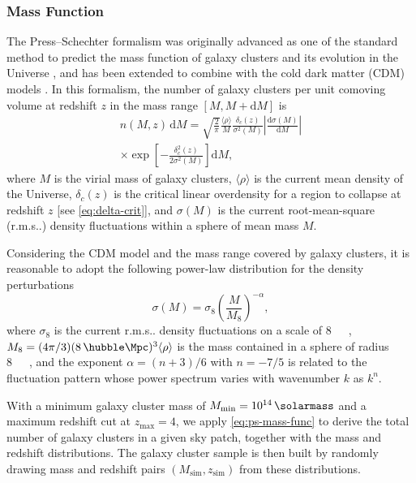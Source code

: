 \documentclass[twocolumn]{aastex62}
\makeatletter
\newcommand{\R}[1]{\mathrm{#1}}
\newcommand{\D}[1]{\R{d} #1}
\newcommand{\diff}[2]{\frac{\D{#1}}{\D{#2}}}
\newcommand{\rms}{r.m.s\@ifnextchar.{}{.\@}}
\makeatother
\begin{document}
\subsubsection{Mass Function}
\label{sec:mass-function}

The Press--Schechter formalism was originally advanced as one of the standard
method to predict the mass function of galaxy clusters and its evolution
in the Universe \citep{press1974}, and has been extended to combine with
the cold dark matter (CDM) models \citep[e.g.,][]{bond1991,lacey1993}.
In this formalism, the number of galaxy clusters per unit comoving volume
at redshift $z$ in the mass range $[M, M + \R{d}M]$ is
\begin{multline}
  \label{eq:ps-mass-func}
  n(M, z) \,\D{M} = \sqrt{\frac{2}{\pi}} \frac{\langle{\rho}\rangle}{M}
  \frac{\delta_c(z)}{\sigma^2(M)} \left| \diff{\sigma(M)}{M} \right| \\
  \times \exp\!\left[ -\frac{\delta_c^2(z)}{2\sigma^2(M)} \right] \D{M},
\end{multline}
where $M$ is the virial mass of galaxy clusters,
$\langle {\rho} \rangle$ is the current mean density of the Universe,
$\delta_c(z)$ is the critical linear overdensity for a region to collapse
at redshift $z$ [see \autoref{eq:delta-crit}],
and $\sigma(M)$ is the current root-mean-square (\rms) density
fluctuations within a sphere of mean mass $M$.

Considering the CDM model and the mass range covered by galaxy clusters,
it is reasonable to adopt the following power-law distribution for the
density perturbations \citep{sarazin2002,randall2002}
\begin{equation}
  \label{eq:sigma-mass}
  \sigma(M) = \sigma_8 \left( \frac{M}{M_8} \right)^{-\alpha},
\end{equation}
where $\sigma_8$ is the current \rms{} density fluctuations on
a scale of \SI{8}{\per\hubble\Mpc},
$M_8 = (4\pi/3)(8 \,\si{\per\hubble\Mpc})^3 \langle{\rho}\rangle$
is the mass contained in a sphere of radius \SI{8}{\per\hubble\Mpc},
and the exponent $\alpha = (n+3)/6$ with $n = -7/5$ \citep{randall2002}
is related to the fluctuation pattern whose power spectrum varies
with wavenumber $k$ as $k^n$.

With a minimum galaxy cluster mass of
$M_{\R{min}} = \SI{e14}{\solarmass}$
and a maximum redshift cut at $z_{\R{max}} = 4$,
we apply \autoref{eq:ps-mass-func} to derive the total number of
galaxy clusters in a given sky patch, together with the mass and
redshift distributions.
The galaxy cluster sample is then built by randomly drawing mass and
redshift pairs $(M_{\R{sim}}, z_{\R{sim}})$ from these distributions.
\end{document}
